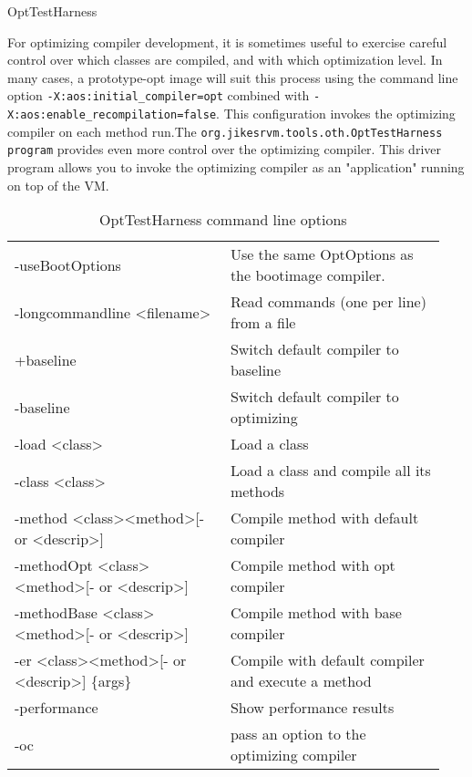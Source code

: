 \begin{section}{OptTestHarness}

For optimizing compiler development, it is sometimes useful to exercise careful control over which classes are compiled, and with which optimization level. In many cases, a prototype-opt image will suit this process using the command line option \verb#-X:aos:initial_compiler=opt# combined with \verb#-X:aos:enable_recompilation=false#. This configuration invokes the optimizing compiler on each method run.The \verb#org.jikesrvm.tools.oth.OptTestHarness program# provides even more control over the optimizing compiler. This driver program allows you to invoke the optimizing compiler as an "application" running on top of the VM.

\begin{table}
\begin{tabular}{p{0.47\linewidth}p{0.47\linewidth}}
-useBootOptions & Use the same OptOptions as the bootimage compiler. \\
-longcommandline \textless filename\textgreater & Read commands (one per line) from a file \\
+baseline & Switch default compiler to baseline \\
-baseline & Switch default compiler to optimizing \\
-load \textless class\textgreater & Load a class \\
-class \textless class\textgreater & Load a class and compile all its methods \\
-method \textless class\textgreater \textless method\textgreater  [- or \textless descrip\textgreater] & Compile method with default compiler \\
-methodOpt \textless class\textgreater \textless method\textgreater  [- or \textless descrip\textgreater] & Compile method with opt compiler \\
-methodBase \textless class\textgreater \textless method\textgreater  [- or \textless descrip\textgreater] & Compile method with base compiler \\
-er \textless class\textgreater \textless method\textgreater  [- or \textless descrip\textgreater] \{args\} & Compile with default compiler and execute a method \\
-performance & Show performance results \\
-oc & pass an option to the optimizing compiler \\
\end{tabular}
\caption{OptTestHarness command line options}
\end{table}


\end{section}
